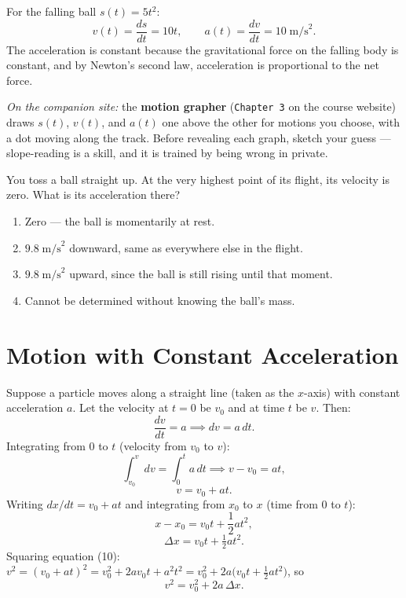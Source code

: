 For the falling ball $s(t)=5t^2$:
\[
  v(t) = \frac{ds}{dt} = 10t, \qquad a(t) = \frac{dv}{dt} = 10\;\text{m/s}^2.
\]
The acceleration is constant because the gravitational force on the falling body is constant,
and by Newton's second law, acceleration is proportional to the net force.

\medskip
\noindent\textit{On the companion site:} the \textbf{motion grapher}
(\texttt{Chapter 3} on the course website) draws $s(t)$, $v(t)$, and $a(t)$
one above the other for motions you choose, with a dot moving along the
track. Before revealing each graph, sketch your guess --- slope-reading is a
skill, and it is trained by being wrong in private.

\begin{checkpoint}
You toss a ball straight up. At the very highest point of its flight, its
velocity is zero. What is its acceleration there?
\begin{enumerate}[label=(\alph*), leftmargin=2.5em, itemsep=0pt]
  \item Zero --- the ball is momentarily at rest.
  \item $9.8\;\text{m/s}^2$ downward, same as everywhere else in the flight.
  \item $9.8\;\text{m/s}^2$ upward, since the ball is still rising until that moment.
  \item Cannot be determined without knowing the ball's mass.
\end{enumerate}
\end{checkpoint}


\section{Motion with Constant Acceleration}

Suppose a particle moves along a straight line (taken as the $x$-axis) with constant
acceleration $a$. Let the velocity at $t=0$ be $v_0$ and at time $t$ be $v$. Then:
\[
  \frac{dv}{dt} = a \implies dv = a\,dt.
\]
Integrating from 0 to $t$ (velocity from $v_0$ to $v$):
\[
  \int_{v_0}^v dv = \int_0^t a\,dt \implies v - v_0 = at,
\]
\begin{equation}
  \boxed{v = v_0 + at.}
\end{equation}
Writing $dx/dt=v_0+at$ and integrating from $x_0$ to $x$ (time from 0 to $t$):
\[
  x - x_0 = v_0 t + \frac{1}{2}at^2,
\]
\begin{equation}
  \boxed{\Delta x = v_0 t + \tfrac{1}{2}at^2.}
\end{equation}
Squaring equation (10): $v^2=(v_0+at)^2=v_0^2+2av_0 t+a^2t^2=v_0^2+2a\bigl(v_0 t+\frac{1}{2}at^2\bigr)$, so
\begin{equation}
  \boxed{v^2 = v_0^2 + 2a\,\Delta x.}
\end{equation}

